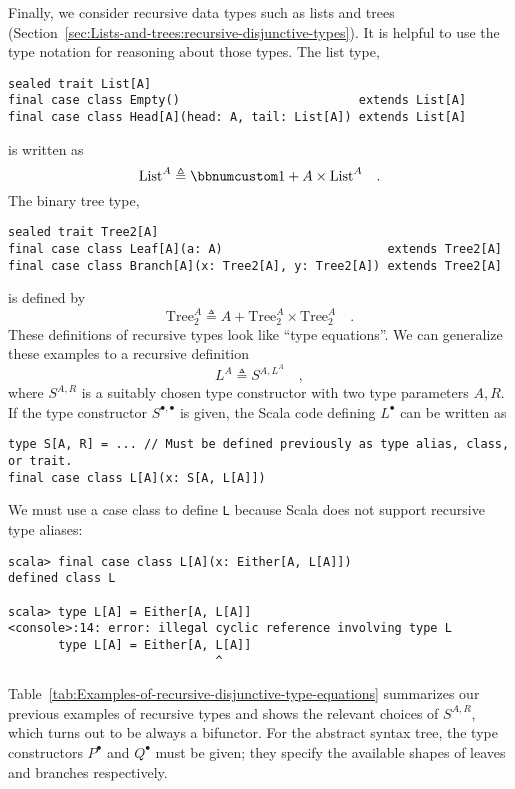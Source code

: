 Finally, we consider recursive data types such as lists and trees
(Section~\ref{sec:Lists-and-trees:recursive-disjunctive-types}).
It is helpful to use the type notation for reasoning about those types.
The list type,
\begin{lstlisting}
sealed trait List[A]
final case class Empty()                         extends List[A]
final case class Head[A](head: A, tail: List[A]) extends List[A]
\end{lstlisting}
is written as
\[
\text{List}^{A}\triangleq\bbnum 1+A\times\text{List}^{A}\quad.
\]
The binary tree type,
\begin{lstlisting}
sealed trait Tree2[A]
final case class Leaf[A](a: A)                       extends Tree2[A]
final case class Branch[A](x: Tree2[A], y: Tree2[A]) extends Tree2[A]
\end{lstlisting}
is defined by
\[
\text{Tree}_{2}^{A}\triangleq A+\text{Tree}_{2}^{A}\times\text{Tree}_{2}^{A}\quad.
\]
These definitions of recursive types look like ``type equations''.
We can generalize these examples to a recursive definition
\begin{equation}
L^{A}\triangleq S^{A,L^{A}}\quad,\label{eq:f-def-recursive-functor}
\end{equation}
where $S^{A,R}$ is a suitably chosen type constructor with two type
parameters $A,R$. If the type constructor $S^{\bullet,\bullet}$
is given, the Scala code defining $L^{\bullet}$ can be written as
\begin{lstlisting}
type S[A, R] = ... // Must be defined previously as type alias, class, or trait.
final case class L[A](x: S[A, L[A]])
\end{lstlisting}
We must use a case class to define \lstinline!L! because Scala does
not support recursive type aliases:
\begin{lstlisting}
scala> final case class L[A](x: Either[A, L[A]])
defined class L 

scala> type L[A] = Either[A, L[A]]
<console>:14: error: illegal cyclic reference involving type L
       type L[A] = Either[A, L[A]]
                             ^
\end{lstlisting}

Table~\ref{tab:Examples-of-recursive-disjunctive-type-equations}
summarizes our previous examples of recursive types and shows the
relevant choices of $S^{A,R}$, which turns out to be always a bifunctor.
For the abstract syntax tree, the type constructors $P^{\bullet}$
and $Q^{\bullet}$ must be given; they specify the available shapes
of leaves and branches respectively. 

